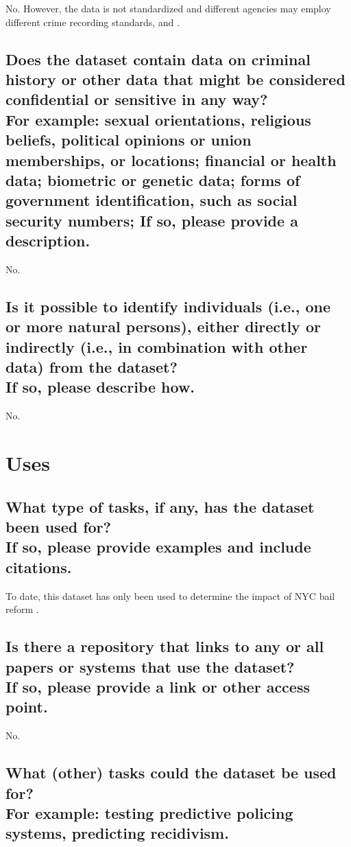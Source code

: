 \documentclass[letterpaper, 10 pt, conference]{ieeeconf}  %
\newcommand{\subtitle}[1]{{\\ \small \normalfont \color{purple} #1}}
\begin{document}
No. However, the data is not standardized and different agencies may employ different crime recording standards, and . 

\subsection{Does the dataset contain data on criminal history or other data that might be considered confidential or sensitive in any way? \subtitle{For example: sexual orientations, religious beliefs, political opinions or union memberships, or locations; financial or health data; biometric or genetic data; forms of government identification, such as social security numbers; If so, please provide a description.}}

No.

\subsection{Is it possible to identify individuals (i.e., one or more natural persons), either directly or indirectly (i.e., in combination with other data) from the dataset? \subtitle{If so, please describe how.}}

No.

\section{Uses}

\subsection{What type of tasks, if any, has the dataset been used for? \subtitle{If so, please provide examples and include citations.}}

To date, this dataset has only been used to determine the impact of NYC bail reform \cite{zhou2021empirical}.

\subsection{Is there a repository that links to any or all papers or systems that use the dataset? \subtitle{If so, please provide a link or other access point. }}

No. 

\subsection{What (other) tasks could the dataset be used for? \subtitle{For example: testing predictive policing systems, predicting recidivism.}}
\end{document}
